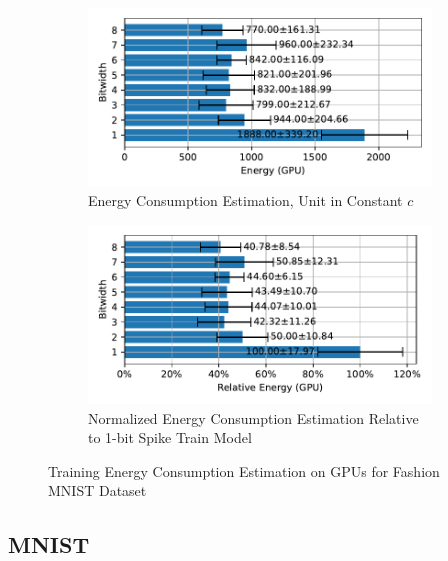         \begin{figure}[H]
            \centering
            \begin{subfigure}[H]{0.6\textwidth}
                \includegraphics[width=\textwidth]{../standard/FashionMNIST/plots/fashionmnist_train_energy_gpu_horizontal.pdf}
                \caption{Energy Consumption Estimation, Unit in Constant $c$}
            \end{subfigure}
            \hfill
            \begin{subfigure}[H]{0.6\textwidth}
                \includegraphics[width=\textwidth]{../standard/FashionMNIST/plots/fashionmnist_train_relative_energy_gpu_horizontal.pdf}
                \caption{Normalized Energy Consumption Estimation Relative to 1-bit Spike Train Model}
            \end{subfigure}
            \caption{Training Energy Consumption Estimation on GPUs for Fashion MNIST Dataset}
        \end{figure}

    \subsection{MNIST}
    \label{appendix:energy_gpu_mnist}

